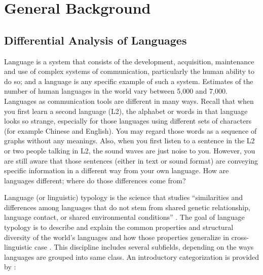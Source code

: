 \chapter{General Background}
\label{literature}

\section{Differential Analysis of Languages}

Language is a system that consists of the development, acquisition, maintenance and use of complex systems of communication, particularly the human ability to do so; and a language is any specific example of such a system. Estimates of the number of human languages in the world vary between 5,000 and 7,000. Languages as communication tools are different in many ways. Recall that when you first learn a second language (L2), the alphabet or words in that language looks so strange, especially for those languages using different sets of characters (for example Chinese and English). You may regard those words as a sequence of graphs without any meanings. Also, when you first listen to a sentence in the L2 or two people talking in L2, the sound waves are just noise to you. However, you are still aware that those sentences (either in text or sound format) are conveying specific information in a different way from your own language. How are languages different; where do those differences come from?

Language (or linguistic) typology is the science that studies ``similarities and differences among languages that do not stem from shared genetic relationship, language contact, or shared environmental conditions'' \citep{moravcsik_2012}. The goal of language typology is to describe and explain the common properties and structural diversity of the world's languages and how those properties generalize in cross-linguistic case \citep{bickel2001typology}. This discipline includes several subfields, depending on the ways languages are grouped into same class. An introductory categorization is provided by \cite{moravcsik2012introducing}:


